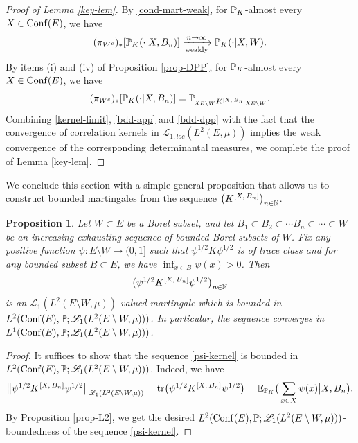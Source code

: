 \documentclass[12pt]{paper}
\newtheorem{proposition}[theorem]{Proposition}
\numberwithin{theorem}{section}
\numberwithin{figure}{section}
\numberwithin{equation}{section}
\begin{document}
\begin{proof}[Proof of Lemma \ref{key-lem}]
By \eqref{cond-mart-weak}, for $\mathbb{P}_K$-almost every $X\in \mathrm{Conf}(E)$, we have
\begin{align}\label{bdd-app}
(\pi_{W^c})_{*}[\mathbb{P}_K(\cdot |X,  B_n)]   \xrightarrow[\text{weakly}]{n\to\infty} \mathbb{P}_K(\cdot | X, W).
\end{align}
By items (i) and (iv) of Proposition \ref{prop-DPP}, for $\mathbb{P}_K$-almost every $X\in \mathrm{Conf}(E)$, we have
\begin{align}\label{bdd-dpp}
(\pi_{W^c})_{*}[\mathbb{P}_K(\cdot |X,  B_n)]  = \mathbb{P}_{\chi_{E\setminus W}  K^{[X, \, B_n]} \chi_{E\setminus W}}.
\end{align}
Combining \eqref{kernel-limit}, \eqref{bdd-app} and \eqref{bdd-dpp} with the fact that the convergence of correlation kernels in $\mathscr{L}_{1, loc}(L^2(E, \mu))$ implies the weak convergence of the corresponding determinantal measures, we complete the proof of Lemma \ref{key-lem}.
\end{proof}
We conclude this section with a simple general proposition that allows us to construct bounded martingales from the sequence $\big(K^{[X, \, B_n]} \big)_{n\in \mathbb{N}}$.

\begin{proposition}\label{prop-L1-cv}
Let $W\subset E$ be a Borel subset, and let $B_1 \subset B_2 \subset \cdots B_n\subset \cdots \subset W $ be an increasing exhausting sequence of bounded Borel subsets of  $W$.
  Fix any positive function $\psi: E\setminus W \rightarrow (0, 1]$ such that $\psi^{1/2}K \psi^{1/2} $ is of trace class and for any bounded subset $B\subset E$, we have $\inf_{x\in B} \psi(x)>0$.
  Then
  \begin{align}\label{psi-kernel}
  \big( \psi^{1/2}  K^{[X, \, B_n]} \psi^{1/2}   \big)_{n\in \mathbb{N}}
  \end{align}
  is an $\mathscr{L}_1( L^2(E\setminus W, \mu))$-valued martingale which is bounded in $L^2(\mathrm{Conf}(E), \mathbb{P}; \mathscr{L}_1(L^2(E\setminus W, \mu)))$.
In particular, the sequence converges in $L^1(\mathrm{Conf}(E), \mathbb{P}; \mathscr{L}_1(L^2( E\setminus W, \mu)))$.
\end{proposition}
\begin{proof}
It suffices to show that the sequence  \eqref{psi-kernel}  is bounded in $L^2(\mathrm{Conf}(E), \mathbb{P}; \mathscr{L}_1(L^2(E\setminus W, \mu)))$. Indeed, we have
\begin{align*}
\big\|\psi^{1/2}  K^{[X, \, B_n]} \psi^{1/2}\big\|_{\mathscr{L}_1(L^2(E\setminus W, \mu))} = \mathrm{tr}\big(\psi^{1/2}  K^{[X, \, B_n]} \psi^{1/2} \big)  = \mathbb{E}_{\mathbb{P}_K}\big(\sum_{x\in X}\psi(x)  \big| X, B_n \big).
\end{align*}
By Proposition \ref{prop-L2}, we get the desired $L^2(\mathrm{Conf}(E), \mathbb{P}; \mathscr{L}_1(L^2(E\setminus W, \mu)))$-boundedness of the sequence \eqref{psi-kernel}.
\end{proof}
\end{document}
